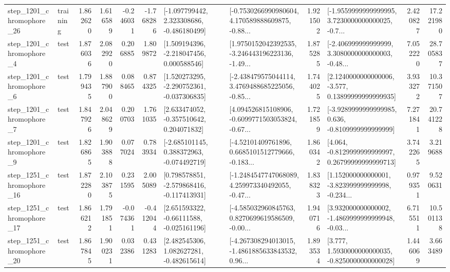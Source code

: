 \begin{tabular}{llrrrrllrlrr}
 step\_1201\_chromophore\_26 &  training &      1.862620 &    1.616589 &     -0.246031 & -1.768286 &   [-1.097799442, 2.323308686, -0.486180499] &  [-0.7530266990980604, 4.170589888609875, -0.88... &       1.921502 &  [-1.9559999999999995, 3.7230000000000025, -0.7... &            2.420827 &         17.221980 \\
  step\_1201\_chromophore\_4 &      test &      1.876036 &    2.082920 &      0.206885 &  1.809872 &    [1.509194396, -2.218047456, 0.000588546] &  [1.9750152042392535, -3.246443196223136, -1.49... &       1.875285 &  [-2.406999999999999, 3.3080000000000003, -0.48... &            7.052220 &         28.705837 \\
  step\_1201\_chromophore\_6 &      test &      1.799435 &    1.887900 &      0.088465 &  0.874325 &   [1.520273295, -2.290752361, -0.037306835] &  [-2.438479575044114, 3.4769488685225056, -0.85... &       1.744025 &  [2.1240000000000006, -3.577, 0.13899999999999935] &            3.933272 &         10.371507 \\
  step\_1201\_chromophore\_7 &      test &      1.847926 &    2.048629 &      0.200703 &  1.761035 &    [2.633474052, -0.357510642, 0.204071832] &  [4.094526815108906, -0.6099771503053824, -0.67... &       1.721859 &  [-3.9289999999999985, 0.636, -0.8109999999999999] &            7.271841 &         20.741228 \\
  step\_1201\_chromophore\_9 &      test &      1.826865 &    1.903888 &      0.077024 &  0.783934 &   [-2.685101145, 0.388372963, -0.074492719] &  [-4.52101409761896, 0.6685101512779666, -0.183... &       1.860342 &  [4.064, -0.8129999999999997, 0.26799999999999713] &            3.742265 &          3.219688 \\
 step\_1251\_chromophore\_16 &      test &      1.872280 &    2.103875 &      0.231595 &  2.005089 &   [0.798578851, -2.579868416, -0.117413931] &  [-1.2484547747068089, 4.259973340492055, -0.47... &       1.838323 &  [1.152000000000001, -3.823999999999998, -0.234... &            0.979351 &          9.520631 \\
 step\_1251\_chromophore\_17 &      test &      1.866212 &    1.791851 &     -0.074361 & -0.412044 &    [2.651593322, -0.66111588, -0.025161196] &  [-4.585032960845763, 0.8270699619586509, -0.00... &       1.940716 &  [3.932000000000002, -1.4869999999999948, -0.03... &            6.715511 &         10.501138 \\
 step\_1251\_chromophore\_20 &      test &      1.867845 &    1.900231 &      0.032386 &  0.431283 &    [2.482545306, 1.082627281, -0.482615614] &  [-4.267308294013015, -1.4861885633843532, 0.96... &       1.893534 &   [3.777, 1.5930000000000035, -0.8250000000000028] &            1.446069 &          3.663489 \\

\end{tabular}
